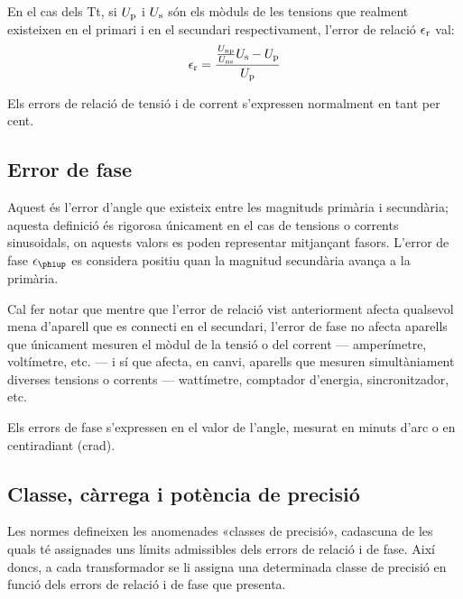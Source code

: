 En el cas dels Tt, si $U_\mathrm{p}$ i $U_\mathrm{s}$ són els mòduls de les tensions que
realment existeixen en el primari i en el secundari respectivament,
l'error de relació $\epsilon_\mathrm{r}$ val:
\begin{equation}
    \epsilon_\mathrm{r} = \frac{\frac{U_\mathrm{np}}{U_\mathrm{ns}} U_\mathrm{s} - U_\mathrm{p}} {U_\mathrm{p}}
\end{equation}

Els errors de relació de tensió i de corrent s'expressen
normalment en tant per cent.

\subsection{Error de fase}

Aquest és l'error d'angle  que existeix entre les magnituds primària i
secundària; aquesta definició és rigorosa únicament en el cas de
tensions o corrents sinusoidals, on aquests valors es poden
representar mitjançant fasors. L'error de fase $\epsilon\ped{\phiup}$ es considera positiu quan la magnitud secundària avança a la primària.
\index{$\epsilon\ped{\phiup}$}

 Cal fer notar que mentre que l'error de relació
vist anteriorment afecta qualsevol mena d'aparell que es
connecti en el secundari, l'error de fase no afecta aparells que
únicament mesuren el mòdul de la tensió o del corrent --- amperímetre,
voltímetre, etc. --- i sí que afecta, en canvi, aparells que mesuren
simultàniament diverses tensions o corrents --- wattímetre, comptador
d'energia, sincronitzador, etc.

Els errors de fase s'expressen en el valor de l'angle, mesurat en
minuts d'arc o en centiradiant (crad).

\subsection{Classe, càrrega i potència de precisió}

Les normes defineixen les anomenades «classes de precisió»,
cadascuna de les quals té assignades uns límits admissibles dels
errors de relació i de fase. Així doncs, a cada transformador
se li assigna una determinada classe de precisió en funció dels errors
de relació i de fase que presenta.

